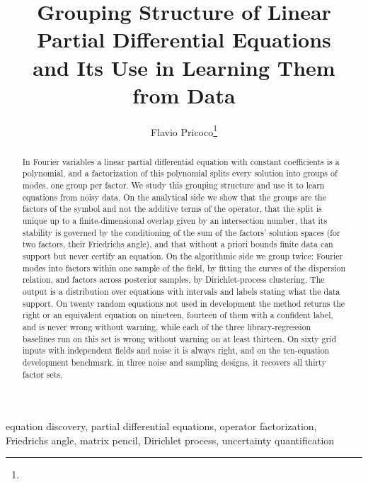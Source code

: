 


\title{Grouping Structure of Linear Partial Differential Equations\\and Its Use in Learning Them from Data}
\author{Flavio Pricoco\thanks{}}


\maketitle

\begin{abstract}
In Fourier variables a linear partial differential equation with constant coefficients is a polynomial, and a
factorization of this polynomial splits every solution into groups of modes, one group per factor. We study this
grouping structure and use it to learn equations from noisy data. On the analytical side we show that the groups are
the factors of the symbol and not the additive terms of the operator, that the split is unique up to a
finite-dimensional overlap given by an intersection number, that its stability is governed by the conditioning of the
sum of the factors' solution spaces (for two factors, their Friedrichs angle), and that without a priori bounds finite
data can support but never certify an equation. On the algorithmic side we group twice: Fourier modes into factors
within one sample of the field, by fitting the curves of the dispersion relation, and factors across posterior samples,
by Dirichlet-process clustering. The output is a distribution over equations with intervals and labels stating what
the data support. On twenty random equations not used in development the method returns the right or an equivalent
equation on nineteen, fourteen of them with a confident label, and is never wrong without warning, while each of the
three library-regression baselines run on this set is wrong without warning on at least thirteen. On sixty grid inputs with
independent fields and noise it is always right, and on the ten-equation development benchmark, in three noise and
sampling designs, it recovers all thirty factor sets.
\end{abstract}

\begin{keywords}
equation discovery, partial differential equations, operator factorization, Friedrichs angle, matrix pencil,
Dirichlet process, uncertainty quantification
\end{keywords}

